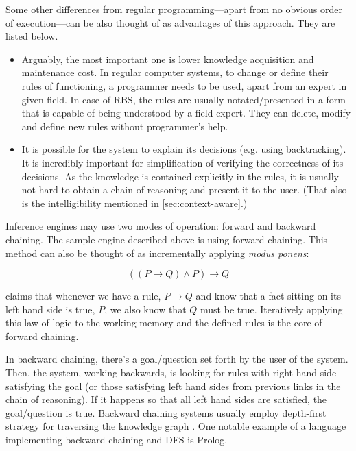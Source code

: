 Some other differences from regular programming---apart from no obvious order of execution---can be also thought of as advantages of this approach. They are listed below.

\begin{itemize}
	\item Arguably, the most important one is lower knowledge acquisition and maintenance cost. In regular computer systems, to change or define their rules of functioning, a programmer needs to be used, apart from an expert in given field. In case of RBS, the rules are usually notated/presented in a form that is capable of being understood by a field expert. They can delete, modify and define new rules without programmer's help.
	\item It is possible for the system to explain its decisions (e.g. using backtracking). It is incredibly important for simplification of verifying the correctness of its decisions. As the knowledge is contained explicitly in the rules, it is usually not hard to obtain a chain of reasoning and present it to the user. (That also is the intelligibility mentioned in \cref{sec:context-aware}.)
\end{itemize}

Inference engines may use two modes of operation: forward and backward chaining. The sample engine described above is using forward chaining. This method can also be thought of as incrementally applying \emph{modus ponens}:

\begin{equation}
	((P \to Q) \land P) \to Q
	\label{eq:modus-ponens}
\end{equation}

 claims that whenever we have a rule, $P \to Q$ and know that a fact sitting on its left hand side is true, $P$, we also know that $Q$ must be true. Iteratively applying this law of logic to the working memory and the defined rules is the core of forward chaining.

In backward chaining, there's a goal/question set forth by the user of the system. Then, the system, working backwards, is looking for rules with right hand side satisfying the goal (or those satisfying left hand sides from previous links in the chain of reasoning). If it happens so that all left hand sides are satisfied, the goal/question is true. Backward chaining systems usually employ depth-first strategy for traversing the knowledge graph \cite{chein2008graph}. One notable example of a language implementing backward chaining and DFS is Prolog.

